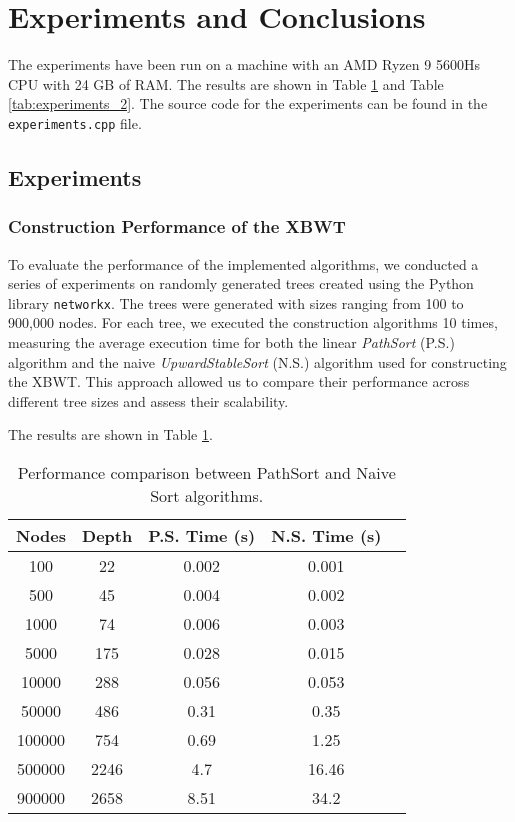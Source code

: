\section{Experiments and Conclusions}

The experiments have been run on a machine with an AMD Ryzen 9 5600Hs CPU with 24 GB of RAM. The results are shown in Table \ref{tab:experiments} and Table \ref{tab:experiments_2}. The source code for the experiments can be found in the \texttt{experiments.cpp} file.

\subsection{Experiments}
\subsubsection{Construction Performance of the XBWT}
To evaluate the performance of the implemented algorithms, we conducted a series of experiments on randomly generated trees created using the Python library \texttt{networkx}. The trees were generated with sizes ranging from 100 to 900,000 nodes. For each tree, we executed the construction algorithms 10 times, measuring the average execution time for both the linear \emph{PathSort} (P.S.) algorithm and the naive \emph{UpwardStableSort} (N.S.) algorithm used for constructing the XBWT. This approach allowed us to compare their performance across different tree sizes and assess their scalability.


The results are shown in Table \ref{tab:experiments}.

\begin{table}[h]
    \centering
    \begin{tabular}{|c|c|c|c|c|}
        \hline
        \textbf{Nodes} & \textbf{Depth} & \textbf{P.S. Time (s)} & \textbf{N.S. Time (s)} \\
        \hline
        100 & 22 & 0.002 & 0.001 \\
        500 & 45 & 0.004 & 0.002  \\
        1000 & 74 & 0.006 & 0.003  \\
        5000 & 175 & 0.028 & 0.015 \\
        10000 & 288 & 0.056 & 0.053 \\
        50000 & 486 & 0.31 & 0.35 \\
        100000 & 754 & 0.69 & 1.25\\
        500000 & 2246 & 4.7 & 16.46 \\
        900000 & 2658 & 8.51 & 34.2 \\
        \hline
    \end{tabular}
    \caption{Performance comparison between PathSort and Naive Sort algorithms.}
    \label{tab:experiments}
\end{table}


